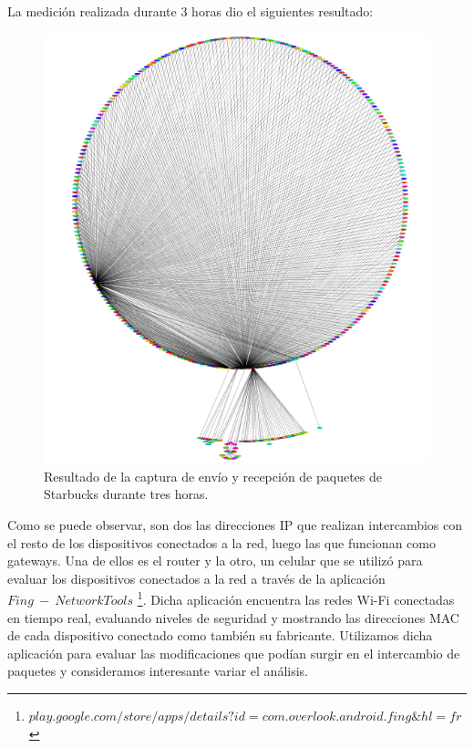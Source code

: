 \documentclass[10pt, a4paper]{article}
\begin{document}
La medición realizada durante 3 horas dio el siguientes resultado:
\begin{figure}[H] %
\begin{center}
\includegraphics[width=400pt]{../imgs/starbucks_entero.png}
\caption{Resultado de la captura de envío y recepción de paquetes de Starbucks durante tres horas.}
\end{center}
\end{figure}

Como se puede observar, son dos las direcciones IP que realizan intercambios con el resto de los dispositivos conectados a la red, luego las que funcionan como gateways. Una de ellos es el router y la otro, un celular que se utilizó para evaluar los dispositivos conectados a la red a través de la aplicación $Fing\ -\ Network Tools$ \footnote{$play.google.com/store/apps/details?id=com.overlook.android.fing\&hl=fr$}. Dicha aplicación encuentra las redes Wi-Fi conectadas en tiempo real, evaluando niveles de seguridad y mostrando las direcciones MAC de cada dispositivo conectado como también su fabricante. Utilizamos dicha aplicación para evaluar las modificaciones que podían surgir en el intercambio de paquetes y consideramos interesante variar el análisis.
\end{document}
